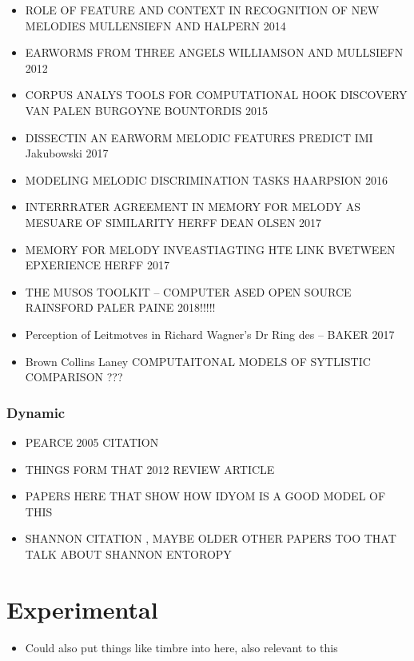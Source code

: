 \documentclass[]{book}
\providecommand{\tightlist}{%
  \setlength{\itemsep}{0pt}\setlength{\parskip}{0pt}}
\theoremstyle{definition}
\theoremstyle{definition}
\theoremstyle{definition}
\theoremstyle{remark}
\begin{document}
\begin{itemize}
\item
  ROLE OF FEATURE AND CONTEXT IN RECOGNITION OF NEW MELODIES MULLENSIEFN
  AND HALPERN 2014
\item
  EARWORMS FROM THREE ANGELS WILLIAMSON AND MULLSIEFN 2012
\item
  CORPUS ANALYS TOOLS FOR COMPUTATIONAL HOOK DISCOVERY VAN PALEN
  BURGOYNE BOUNTORDIS 2015
\item
  DISSECTIN AN EARWORM MELODIC FEATURES PREDICT IMI Jakubowski 2017
\item
  MODELING MELODIC DISCRIMINATION TASKS HAARPSION 2016
\item
  INTERRRATER AGREEMENT IN MEMORY FOR MELODY AS MESUARE OF SIMILARITY
  HERFF DEAN OLSEN 2017
\item
  MEMORY FOR MELODY INVEASTIAGTING HTE LINK BVETWEEN EPXERIENCE HERFF
  2017
\item
  THE MUSOS TOOLKIT -- COMPUTER ASED OPEN SOURCE RAINSFORD PALER PAINE
  2018!!!!!
\item
  Perception of Leitmotves in Richard Wagner's Dr Ring des -- BAKER 2017
\item
  Brown Collins Laney COMPUTAITONAL MODELS OF SYTLISTIC COMPARISON ???
\end{itemize}

\hypertarget{dynamic}{%
\subsubsection{Dynamic}\label{dynamic}}

\begin{itemize}
\tightlist
\item
  PEARCE 2005 CITATION
\item
  THINGS FORM THAT 2012 REVIEW ARTICLE
\item
  PAPERS HERE THAT SHOW HOW IDYOM IS A GOOD MODEL OF THIS
\item
  SHANNON CITATION , MAYBE OLDER OTHER PAPERS TOO THAT TALK ABOUT
  SHANNON ENTOROPY
\end{itemize}

\hypertarget{experimental}{%
\section{Experimental}\label{experimental}}

\begin{itemize}
\tightlist
\item
  Could also put things like timbre into here, also relevant to this
\end{itemize}
\end{document}
